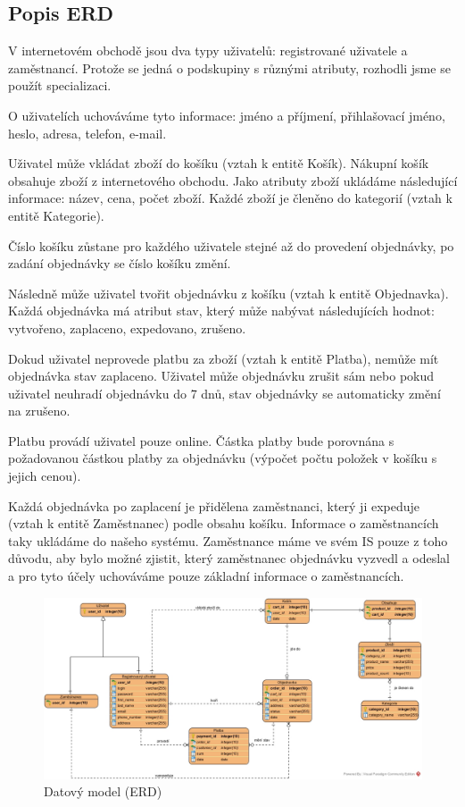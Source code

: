 \documentclass[12pt, a4paper]{article}
\begin{document}
\subsection{Popis ERD}

V internetovém obchodě jsou dva typy uživatelů: registrované uživatele a zaměstnancí. Protože se jedná o podskupiny s různými atributy, rozhodli jsme se použít specializaci.

O uživatelích uchováváme tyto informace: jméno a příjmení, přihlašovací jméno, heslo, adresa, telefon, e-mail.

Uživatel může vkládat zboží do košíku (vztah k entitě Košík). Nákupní košík obsahuje zboží z internetového obchodu. Jako atributy zboží ukládáme následující informace: název, cena, počet zboží. Každé zboží je členěno do kategorií (vztah k entitě Kategorie).

Číslo košíku zůstane pro každého uživatele stejné až do provedení objednávky, po zadání objednávky se číslo košíku změní.

Následně může uživatel  tvořit objednávku z košíku (vztah k entitě Objednavka). Každá objednávka má atribut stav, který může nabývat následujících hodnot: vytvořeno, zaplaceno, expedovano, zrušeno. 

Dokud uživatel neprovede platbu za zboží (vztah k entitě Platba), nemůže mít objednávka stav zaplaceno. Uživatel může objednávku zrušit sám nebo pokud uživatel neuhradí objednávku do 7 dnů, stav objednávky se automaticky změní na zrušeno.

Platbu provádí uživatel pouze online. Částka platby bude porovnána s požadovanou částkou platby za objednávku (výpočet počtu položek v košíku s jejich cenou).

Každá objednávka po zaplacení je přidělena zaměstnanci, který ji expeduje (vztah k entitě Zaměstnanec) podle obsahu košíku.
Informace o zaměstnancích taky ukládáme do našeho systému. Zaměstnance máme ve svém IS pouze z toho důvodu, aby bylo možné zjistit, který zaměstnanec objednávku vyzvedl a odeslal a pro tyto účely uchováváme pouze základní informace o zaměstnancích.

 \begin{landscape}
 \begin{figure}[!ht]
    \centering
    \includegraphics[width=1\linewidth]{IDS_ER_diagram.jpg}
    \caption{Datový model (ERD)}
    \label{figure:ast_example1}
\end{figure}

\end{landscape}
\end{document}
